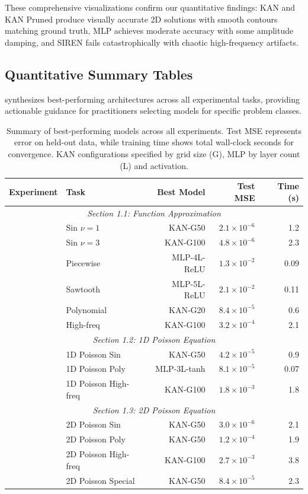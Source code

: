 \documentclass[11pt,a4paper]{article}
\begin{document}
These comprehensive visualizations confirm our quantitative findings: KAN and KAN Pruned produce visually accurate 2D solutions with smooth contours matching ground truth, MLP achieves moderate accuracy with some amplitude damping, and SIREN fails catastrophically with chaotic high-frequency artifacts.

\subsection{Quantitative Summary Tables}

 synthesizes best-performing architectures across all experimental tasks, providing actionable guidance for practitioners selecting models for specific problem classes.

\begin{table}[htbp]
\centering
\caption{Summary of best-performing models across all experiments. Test MSE represents error on held-out data, while training time shows total wall-clock seconds for convergence. KAN configurations specified by grid size (G), MLP by layer count (L) and activation.}
\label{tab:summary}
\begin{tabular}{llrrr}
\toprule
\textbf{Experiment} & \textbf{Task} & \textbf{Best Model} & \textbf{Test MSE} & \textbf{Time (s)} \\
\midrule
\multicolumn{5}{c}{\textit{Section 1.1: Function Approximation}} \\
\midrule
 & Sin $\nu=1$ & KAN-G50 & $2.1 \times 10^{-6}$ & 1.2 \\
 & Sin $\nu=3$ & KAN-G100 & $4.8 \times 10^{-6}$ & 2.3 \\
 & Piecewise & MLP-4L-ReLU & $1.3 \times 10^{-2}$ & 0.09 \\
 & Sawtooth & MLP-5L-ReLU & $2.1 \times 10^{-2}$ & 0.11 \\
 & Polynomial & KAN-G20 & $8.4 \times 10^{-5}$ & 0.6 \\
 & High-freq & KAN-G100 & $3.2 \times 10^{-4}$ & 2.1 \\
\midrule
\multicolumn{5}{c}{\textit{Section 1.2: 1D Poisson Equation}} \\
\midrule
 & 1D Poisson Sin & KAN-G50 & $4.2 \times 10^{-5}$ & 0.9 \\
 & 1D Poisson Poly & MLP-3L-tanh & $8.1 \times 10^{-5}$ & 0.07 \\
 & 1D Poisson High-freq & KAN-G100 & $1.8 \times 10^{-3}$ & 1.8 \\
\midrule
\multicolumn{5}{c}{\textit{Section 1.3: 2D Poisson Equation}} \\
\midrule
 & 2D Poisson Sin & KAN-G50 & $3.0 \times 10^{-6}$ & 2.1 \\
 & 2D Poisson Poly & KAN-G50 & $1.2 \times 10^{-4}$ & 1.9 \\
 & 2D Poisson High-freq & KAN-G100 & $2.7 \times 10^{-3}$ & 3.8 \\
 & 2D Poisson Special & KAN-G50 & $8.4 \times 10^{-5}$ & 2.3 \\
\bottomrule
\end{tabular}
\end{table}
\end{document}
